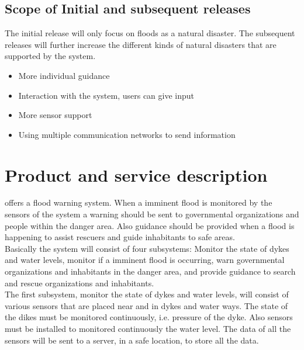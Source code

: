 \subsection{Scope of Initial and subsequent releases}

The initial release will only focus on floods as a natural disaster. The subsequent releases will further increase the different kinds of natural disasters that are supported by the system.\\

	\begin{itemize}
		\item More individual guidance
		\item Interaction with the system, users can give input
		\item More sensor support
		\item Using multiple communication networks to send information
	\end{itemize}

\section{Product and service description}
\CompanyName offers a flood warning system. When a imminent flood is monitored by the sensors of the system a warning should be sent to governmental organizations and people within the danger area. Also guidance should be provided when a flood is happening to assist rescuers and guide inhabitants to safe areas.\\

Basically the system will consist of four subsystems: Monitor the state of dykes and water levels, monitor if a imminent flood is occurring, warn governmental organizations and inhabitants in the danger area, and provide guidance to search and rescue organizations and inhabitants.\\

The first subsystem, monitor the state of dykes and water levels, will consist of various sensors that are placed near and in dykes and water ways. The state of the dikes must be monitored continuously, i.e. pressure of the dyke. Also sensors must be installed to monitored continuously the water level. The data of all the sensors will be sent to a server, in a safe location, to store all the data.\\

